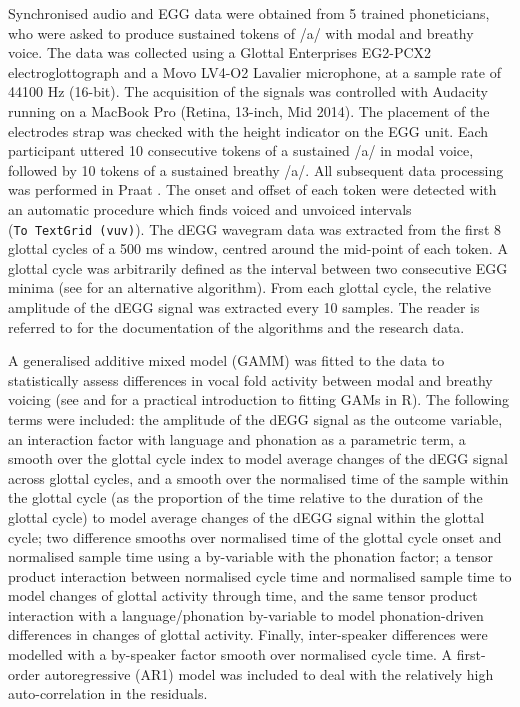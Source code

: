 \documentclass[
  11pt,
  a4paper,
]{article}
\begin{document}
Synchronised audio and EGG data were obtained from 5 trained
phoneticians, who were asked to produce sustained tokens of /a/ with
modal and breathy voice. The data was collected using a Glottal
Enterprises EG2-PCX2 electroglottograph and a Movo LV4-O2 Lavalier
microphone, at a sample rate of 44100 Hz (16-bit). The acquisition of
the signals was controlled with Audacity running on a MacBook Pro
(Retina, 13-inch, Mid 2014). The placement of the electrodes strap was
checked with the height indicator on the EGG unit. Each participant
uttered 10 consecutive tokens of a sustained /a/ in modal voice,
followed by 10 tokens of a sustained breathy /a/. All subsequent data
processing was performed in Praat \citep{boersma2018}. The onset and
offset of each token were detected with an automatic procedure which
finds voiced and unvoiced intervals (\texttt{To\ TextGrid\ (vuv)}). The
dEGG wavegram data was extracted from the first 8 glottal cycles of a
500 ms window, centred around the mid-point of each token. A glottal
cycle was arbitrarily defined as the interval between two consecutive
EGG minima (see \citealt{herbst2010} for an alternative algorithm). From
each glottal cycle, the relative amplitude of the dEGG signal was
extracted every 10 samples. The reader is referred to
\citet{coretta2017e} for the documentation of the algorithms and the
research data.

A generalised additive mixed model (GAMM) was fitted to the data to
statistically assess differences in vocal fold activity between modal
and breathy voicing (see \citealt{soskuthy2017} and
\citealt{wieling2018} for a practical introduction to fitting GAMs in
R). The following terms were included: the amplitude of the dEGG signal
as the outcome variable, an interaction factor with language and
phonation as a parametric term, a smooth over the glottal cycle index to
model average changes of the dEGG signal across glottal cycles, and a
smooth over the normalised time of the sample within the glottal cycle
(as the proportion of the time relative to the duration of the glottal
cycle) to model average changes of the dEGG signal within the glottal
cycle; two difference smooths over normalised time of the glottal cycle
onset and normalised sample time using a by-variable with the phonation
factor; a tensor product interaction between normalised cycle time and
normalised sample time to model changes of glottal activity through
time, and the same tensor product interaction with a language/phonation
by-variable to model phonation-driven differences in changes of glottal
activity. Finally, inter-speaker differences were modelled with a
by-speaker factor smooth over normalised cycle time. A first-order
autoregressive (AR1) model was included to deal with the relatively high
auto-correlation in the residuals.
\end{document}
